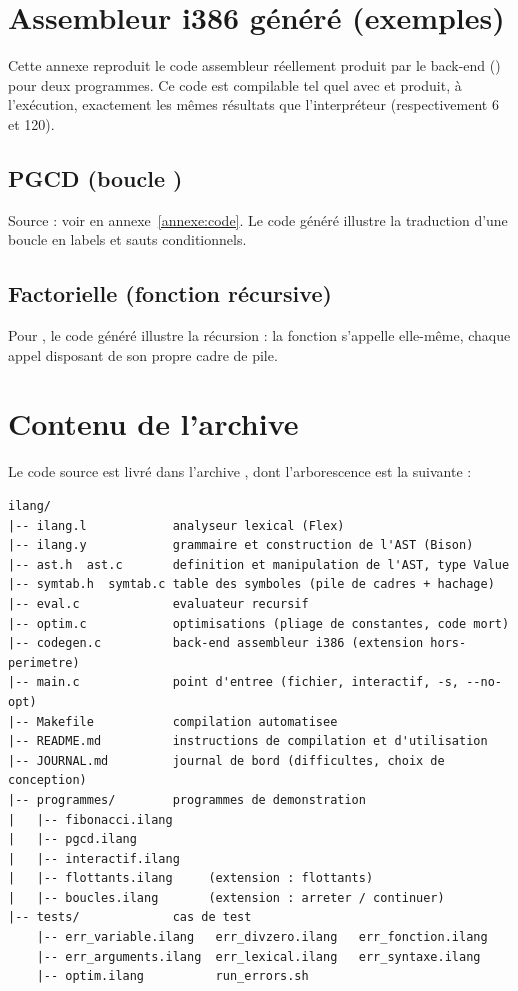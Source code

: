 \chapter{Assembleur i386 généré (exemples)}
\label{annexe:asm}

Cette annexe reproduit le code assembleur réellement produit par le back-end
() pour deux programmes. Ce code est compilable tel quel avec
 et produit, à l'exécution, exactement les mêmes résultats
que l'interpréteur (respectivement 6 et 120).

\section{PGCD (boucle )}
Source : voir  en annexe~\ref{annexe:code}. Le code généré
illustre la traduction d'une boucle en labels et sauts conditionnels.


\section{Factorielle (fonction récursive)}
Pour , le code généré illustre la récursion : la fonction
 s'appelle elle-même, chaque appel disposant de son propre
cadre de pile.


\chapter{Contenu de l'archive}
\label{annexe:archive}

Le code source est livré dans l'archive
, dont
l'arborescence est la suivante :

\begin{lstlisting}[style=gram]
ilang/
|-- ilang.l            analyseur lexical (Flex)
|-- ilang.y            grammaire et construction de l'AST (Bison)
|-- ast.h  ast.c       definition et manipulation de l'AST, type Value
|-- symtab.h  symtab.c table des symboles (pile de cadres + hachage)
|-- eval.c             evaluateur recursif
|-- optim.c            optimisations (pliage de constantes, code mort)
|-- codegen.c          back-end assembleur i386 (extension hors-perimetre)
|-- main.c             point d'entree (fichier, interactif, -s, --no-opt)
|-- Makefile           compilation automatisee
|-- README.md          instructions de compilation et d'utilisation
|-- JOURNAL.md         journal de bord (difficultes, choix de conception)
|-- programmes/        programmes de demonstration
|   |-- fibonacci.ilang
|   |-- pgcd.ilang
|   |-- interactif.ilang
|   |-- flottants.ilang     (extension : flottants)
|   |-- boucles.ilang       (extension : arreter / continuer)
|-- tests/             cas de test
    |-- err_variable.ilang   err_divzero.ilang   err_fonction.ilang
    |-- err_arguments.ilang  err_lexical.ilang   err_syntaxe.ilang
    |-- optim.ilang          run_errors.sh
\end{lstlisting}


